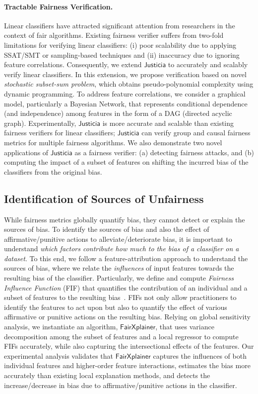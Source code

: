 \documentclass[11pt]{article}
\begin{document}
	\paragraph{Tractable Fairness Verification.} Linear classifiers have attracted significant attention from researchers in the context of fair algorithms. Existing fairness verifier suffers from two-fold limitations for verifying linear classifiers: (i) poor scalability due to applying SSAT/SMT or sampling-based techniques and (ii) inaccuracy due to ignoring feature correlations. Consequently, we extend $ \mathsf{Justicia} $ to accurately and scalably verify linear classifiers. In this extension, we propose verification based on novel \textit{stochastic subset-sum problem}, which obtains pseudo-polynomial complexity using dynamic programming. To address feature correlations, we consider a graphical model, particularly a Bayesian Network, that represents conditional dependence (and independence) among features in the form of a DAG (directed acyclic graph). Experimentally,  $ \mathsf{Justicia} $ is more accurate and scalable than existing fairness verifiers for linear classifiers; $ \mathsf{Justicia} $ can verify group and causal fairness metrics for multiple fairness algorithms. We also demonstrate two novel applications of $ \mathsf{Justicia} $ as a fairness verifier: (a) detecting fairness attacks, and (b) computing the impact of a subset of features on shifting the incurred bias of the classifiers from the original bias.
	
	
	
	
	
	
	\subsection*{Identification of Sources of Unfairness}
	While fairness metrics globally quantify bias, they cannot detect or explain the sources of bias. To identify the sources of bias and also the effect of affirmative/punitive actions to alleviate/deteriorate bias, it is important to understand \textit{which factors contribute how much to the bias of a classifier on a dataset}. To this end, we follow a feature-attribution approach to understand the sources of bias, where we relate the \emph{influences} of input features towards the resulting bias of the classifier. Particularly, we define and compute \textit{Fairness Influence Function} (FIF) that quantifies the contribution of an individual and a subset of features to the resulting bias~\cite{ghosh2022how}. FIFs not only allow practitioners to identify the features to act upon but also to quantify the effect of various affirmative or punitive actions on the resulting bias. Relying on global sensitivity analysis, we instantiate an algorithm, $ \mathsf{FairXplainer} $, that uses variance decomposition among the subset of features and a local regressor to compute FIFs accurately, while also capturing the intersectional effects of the features. Our experimental analysis validates that $ \mathsf{FairXplainer} $ captures the influences of both individual features and higher-order feature interactions, estimates the bias more accurately than existing local explanation methods, and detects the increase/decrease in bias due to affirmative/punitive actions in the classifier.
	
\end{document}
